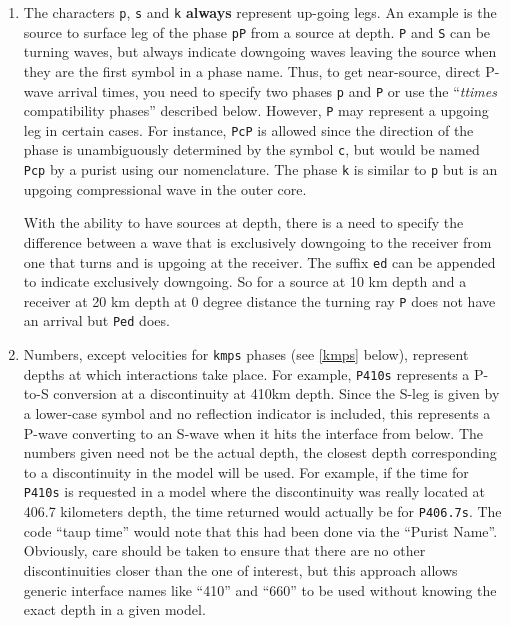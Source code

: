 \begin{enumerate}
\item \label{Ped} The characters \texttt{p}, \texttt{s} and \texttt{k} \textbf{always} represent
up-going legs.
An example is the source to surface leg of the phase \texttt{pP}
from a source at depth.
\texttt{P} and \texttt{S} can be turning waves, but
always indicate downgoing waves leaving the source when they are the first symbol in a
phase name.
Thus, to get near-source, direct P-wave arrival times, you need to specify two
phases \texttt{p} and \texttt{P} or use the ``\textit{ttimes} compatibility phases'' described
below.
However, \texttt{P} may
represent a upgoing leg in certain cases.
For instance, \texttt{PcP} is
allowed since the direction of the phase is unambiguously determined by the symbol
\texttt{c}, but would be named \texttt{Pcp} by a purist using our nomenclature. The phase
\texttt{k} is similar to \texttt{p} but is an upgoing compressional wave in the outer core.

With the ability to have sources at depth, there is a need to specify the difference between a wave that is
exclusively downgoing to the receiver from one that turns and is upgoing at the receiver. The suffix \texttt{ed}
can be appended to indicate exclusively downgoing. So for a source at 10 km depth and a receiver at 20 km depth
at 0 degree distance the turning ray \texttt{P} does not have an arrival but \texttt{Ped} does.

\item Numbers, except velocities for \texttt{kmps}
phases (see \ref{kmps} below),
represent depths at which interactions take place.
For example, \texttt{P410s} represents a P-to-S conversion at a discontinuity at 410km
depth.
Since the S-leg is given by a lower-case symbol and no reflection indicator is
included, this represents a P-wave  converting to an S-wave when it hits the interface
from below.
The numbers given need not be the actual depth, the closest depth corresponding to a
discontinuity in the model will be used.
For example, if the time for \texttt{P410s} is requested in a model where the discontinuity
was really located at 406.7 kilometers depth, the time returned would actually be for
\texttt{P406.7s}.
The code ``taup time'' would note that this had been done via the ``Purist Name''.
Obviously, care should be taken to ensure that there are no other discontinuities
closer than the one of interest, but this approach allows generic interface
names like ``410'' and ``660'' to be used without knowing the exact depth in a given
model.


\end{enumerate}
